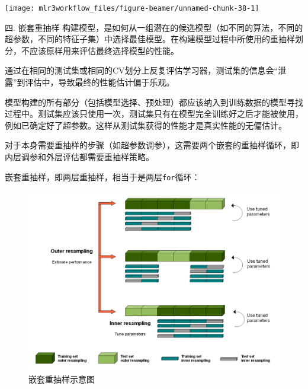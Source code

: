 \documentclass[
  11pt,
  ignorenonframetext,
  dvipsnames,UTF8]{beamer}
\newenvironment{Shaded}{\begin{snugshade}}{\end{snugshade}}
\newcommand{\FunctionTok}[1]{\textcolor[rgb]{0.00,0.00,0.00}{#1}}
\newcommand{\NormalTok}[1]{#1}
\newcommand{\SpecialCharTok}[1]{\textcolor[rgb]{0.00,0.00,0.00}{#1}}
\begin{document}
\begin{frame}[fragile]{}
\protect\hypertarget{section-27}{}
\begin{Shaded}
\end{Shaded}

\begin{center}\texttt{[image: mlr3workflow\_files/figure-beamer/unnamed-chunk-38-1]} \end{center}
\end{frame}

\begin{frame}{四. 嵌套重抽样}
\protect\hypertarget{ux56db.-ux5d4cux5957ux91cdux62bdux6837}{}
构建模型，是如何从一组潜在的候选模型（如不同的算法，不同的超参数，不同的特征子集）中选择最佳模型。在构建模型过程中所使用的重抽样划分，不应该原样用来评估最终选择模型的性能。

通过在相同的测试集或相同的CV划分上反复评估学习器，测试集的信息会``泄露''到评估中，导致最终的性能估计偏于乐观。

模型构建的所有部分（包括模型选择、预处理）都应该纳入到训练数据的模型寻找过程中。测试集应该只使用一次，测试集只有在模型完全训练好之后才能被使用，例如已确定好了超参数。这样从测试集获得的性能才是真实性能的无偏估计。

对于本身需要重抽样的步骤（如超参数调参），这需要两个嵌套的重抽样循环，即内层调参和外层评估都需要重抽样策略。
\end{frame}

\begin{frame}[fragile]{}
\protect\hypertarget{section-28}{}
嵌套重抽样，即两层重抽样，相当于是两层\texttt{for}循环：

\begin{figure}

{\centering \includegraphics[width=0.78\linewidth]{images/nested_resampling} 

}

\caption{嵌套重抽样示意图}\label{fig:unnamed-chunk-39}
\end{figure}
\end{frame}
\end{document}
